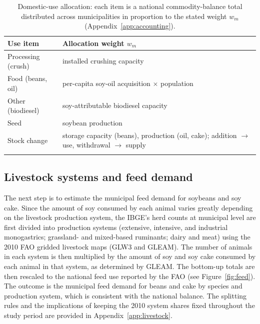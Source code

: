 \documentclass[pdflatex,sn-nature]{sn-jnl}%
\begin{document}
\begin{table}[htbp]
\small
\caption{Domestic-use allocation: each item is a national commodity-balance
total distributed across municipalities in proportion to the stated weight
$w_m$ (Appendix~\ref{app:accounting}).}\label{tab:weights}
\begin{tabularx}{\textwidth}{@{}lX@{}}
\toprule
Use item & Allocation weight $w_m$ \\
\midrule
Processing (crush)  & installed crushing capacity \\
Food (beans, oil)   & per-capita soy-oil acquisition $\times$ population \\
Other (biodiesel)   & soy-attributable biodiesel capacity \\
Seed                & soybean production \\
Stock change        & storage capacity (beans), production (oil, cake); addition $\to$ use, withdrawal $\to$ supply \\
\botrule
\end{tabularx}
\end{table}

\subsection{Livestock systems and feed demand}\label{subsec:feed}
The next step is to estimate the municipal feed demand for soybeans and soy
cake. Since the amount of soy consumed by each animal varies greatly
depending on the livestock production system, the IBGE's herd counts at
municipal level are first divided into production systems (extensive,
intensive, and industrial monogastrics; grassland- and mixed-based
ruminants; dairy and meat) using the 2010 FAO gridded livestock maps (GLW3
and GLEAM). The number of animals in each system is then multiplied by the
amount of soy and soy cake consumed by each animal in that system, as
determined by GLEAM. The bottom-up totals are then rescaled to the national
feed use reported by the FAO (see Figure~\ref{fig:feed}). The outcome is
the municipal feed demand for beans and cake by species and production
system, which is consistent with the national balance. The
\textcolor{green!50!black}{splitting rules} and the implications of
keeping the 2010 system shares fixed
throughout the study period are provided in
Appendix~\ref{app:livestock}.
\end{document}
